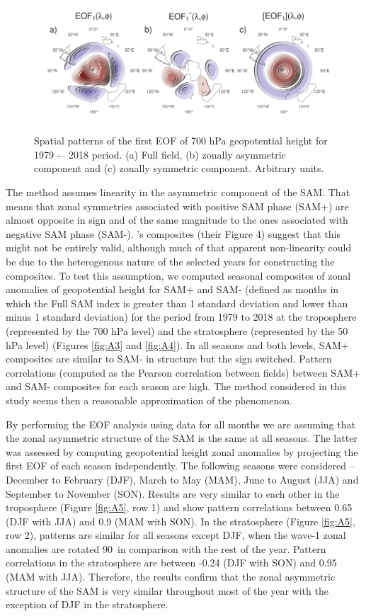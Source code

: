 \documentclass[smallextended]{svjour3}       %
\begin{document}
\begin{figure}
\includegraphics{method-1} \caption{Spatial patterns of the first EOF of 700 hPa geopotential height for 1979 -– 2018 period. (a) Full field, (b) zonally asymmetric component and (c) zonally symmetric component. Arbitrary units.}\label{fig:method}
\end{figure}

The method assumes linearity in the asymmetric component of the SAM. That means that zonal symmetries associated with positive SAM phase (SAM+) are almost opposite in sign and of the same magnitude to the ones associated with negative SAM phase (SAM-). \citet{fogt2012}'s composites (their Figure 4) suggest that this might not be entirely valid, although much of that apparent non-linearity could be due to the heterogenous nature of the selected years for constructing the composites. To test this assumption, we computed seasonal composites of zonal anomalies of geopotential height for SAM+ and SAM- (defined as months in which the Full SAM index is greater than 1 standard deviation and lower than minus 1 standard deviation) for the period from 1979 to 2018 at the troposphere (represented by the 700 hPa level) and the stratosphere (represented by the 50 hPa level) (Figures \ref{fig:A3} and \ref{fig:A4}). In all seasons and both levels, SAM+ composites are similar to SAM- in structure but the sign switched. Pattern correlations (computed as the Pearson correlation between fields) between SAM+ and SAM- composites for each season are high. The method considered in this study seems then a reasonable approximation of the phenomenon.

By performing the EOF analysis using data for all months we are assuming that the zonal asymmetric structure of the SAM is the same at all seasons. The latter was assessed by computing geopotential height zonal anomalies by projecting the first EOF of each season independently. The following seasons were considered -- December to February (DJF), March to May (MAM), June to August (JJA) and September to November (SON). Results are very similar to each other in the troposphere (Figure \ref{fig:A5}, row 1) and show pattern correlations between 0.65 (DJF with JJA) and 0.9 (MAM with SON). In the stratosphere (Figure \ref{fig:A5}, row 2), patterns are similar for all seasons except DJF, when the wave-1 zonal anomalies are rotated 90\degree~in comparison with the rest of the year. Pattern correlations in the stratosphere are between -0.24 (DJF with SON) and 0.95 (MAM with JJA). Therefore, the results confirm that the zonal asymmetric structure of the SAM is very similar throughout most of the year with the exception of DJF in the stratosphere.
\end{document}
